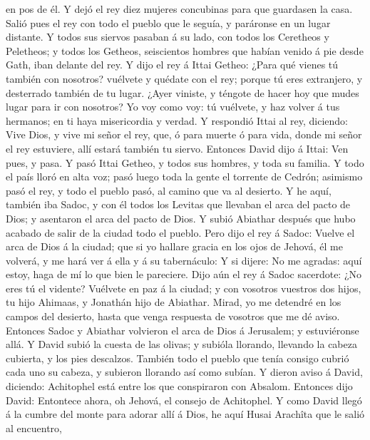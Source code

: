 en pos de él. Y dejó el rey diez mujeres concubinas para que guardasen
la casa.  Salió pues el rey con todo el pueblo que le
seguía, y paráronse en un lugar distante.  Y todos sus
siervos pasaban á su lado, con todos los Ceretheos y Peletheos; y todos
los Getheos, seiscientos hombres que habían venido á pie desde Gath,
iban delante del rey.  Y dijo el rey á Ittai Getheo: ¿Para
qué vienes tú también con nosotros? vuélvete y quédate con el rey;
porque tú eres extranjero, y desterrado también de tu lugar.
 ¿Ayer viniste, y téngote de hacer hoy que mudes lugar para
ir con nosotros? Yo voy como voy: tú vuélvete, y haz volver á tus
hermanos; en ti haya misericordia y verdad.  Y respondió
Ittai al rey, diciendo: Vive Dios, y vive mi señor el rey, que, ó para
muerte ó para vida, donde mi señor el rey estuviere, allí estará también
tu siervo.  Entonces David dijo á Ittai: Ven pues, y pasa.
Y pasó Ittai Getheo, y todos sus hombres, y toda su familia.
 Y todo el país lloró en alta voz; pasó luego toda la gente
el torrente de Cedrón; asimismo pasó el rey, y todo el pueblo pasó, al
camino que va al desierto.  Y he aquí, también iba Sadoc, y
con él todos los Levitas que llevaban el arca del pacto de Dios; y
asentaron el arca del pacto de Dios. Y subió Abiathar después que hubo
acabado de salir de la ciudad todo el pueblo.  Pero dijo el
rey á Sadoc: Vuelve el arca de Dios á la ciudad; que si yo hallare
gracia en los ojos de Jehová, él me volverá, y me hará ver á ella y á su
tabernáculo:  Y si dijere: No me agradas: aquí estoy, haga
de mí lo que bien le pareciere.  Dijo aún el rey á Sadoc
sacerdote: ¿No eres tú el vidente? Vuélvete en paz á la ciudad; y con
vosotros vuestros dos hijos, tu hijo Ahimaas, y Jonathán hijo de
Abiathar.  Mirad, yo me detendré en los campos del
desierto, hasta que venga respuesta de vosotros que me dé aviso.
 Entonces Sadoc y Abiathar volvieron el arca de Dios á
Jerusalem; y estuviéronse allá.  Y David subió la cuesta de
las olivas; y subióla llorando, llevando la cabeza cubierta, y los pies
descalzos. También todo el pueblo que tenía consigo cubrió cada uno su
cabeza, y subieron llorando así como subían.  Y dieron
aviso á David, diciendo: Achitophel está entre los que conspiraron con
Absalom. Entonces dijo David: Entontece ahora, oh Jehová, el consejo de
Achitophel.  Y como David llegó á la cumbre del monte para
adorar allí á Dios, he aquí Husai Arachîta que le salió al encuentro,
